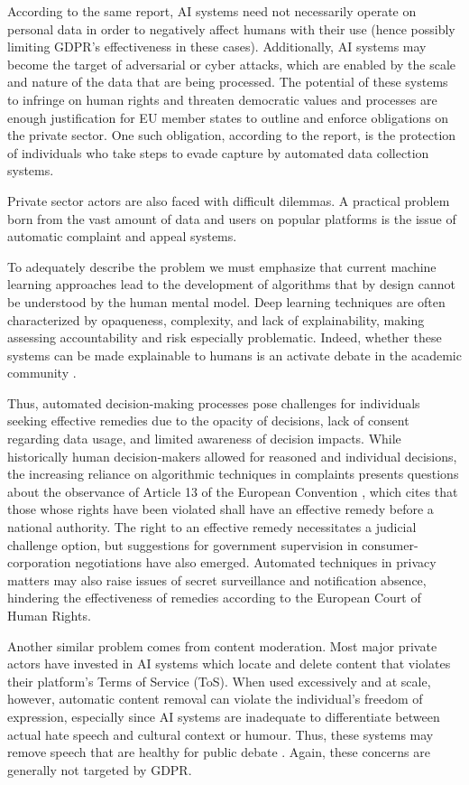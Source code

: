\documentclass{article}
\begin{document}
According to the same report, AI systems need not necessarily operate on personal data in order to negatively affect humans with their use (hence possibly limiting GDPR's effectiveness in these cases). Additionally, AI systems may become the target of adversarial or cyber attacks, which are enabled by the scale and nature of the data that are being processed. The potential of these systems to infringe on human rights and threaten democratic values and processes are enough justification for EU member states to outline and enforce obligations on the private sector. One such obligation, according to the report, is the protection of individuals who take steps to evade capture by automated data collection systems. 

Private sector actors are also faced with difficult dilemmas. A practical problem born from the vast amount of data and users on popular platforms is the issue of automatic complaint and appeal systems. 

To adequately describe the problem we must emphasize that current machine learning approaches lead to the development of algorithms that by design cannot be understood by the human mental model. Deep learning techniques are often characterized by opaqueness, complexity, and lack of explainability, making assessing accountability and risk especially problematic. Indeed, whether these systems can be made explainable to humans is an activate debate in the academic community \cite{wagner2018}. %

Thus, automated decision-making processes pose challenges for individuals seeking effective remedies due to the opacity of decisions, lack of consent regarding data usage, and limited awareness of decision impacts. While historically human decision-makers allowed for reasoned and individual decisions, the increasing reliance on algorithmic techniques in complaints presents questions about the observance of Article 13 of the European Convention \cite{wagner2018}, which cites that those whose rights have been violated shall have an effective remedy before a national authority. The right to an effective remedy necessitates a judicial challenge option, but suggestions for government supervision in consumer-corporation negotiations have also emerged. Automated techniques in privacy matters may also raise issues of secret surveillance and notification absence, hindering the effectiveness of remedies according to the European Court of Human Rights. 

Another similar problem comes from content moderation. Most major private actors have invested in AI systems which locate and delete content that violates their platform's Terms of Service (ToS). When used excessively and at scale, however, automatic content removal can violate the individual's freedom of expression, especially since AI systems are inadequate to differentiate between actual hate speech and cultural context or humour. Thus, these systems may remove speech that are healthy for public debate \cite{wagner2018}. Again, these concerns are generally not targeted by GDPR. 
\end{document}
